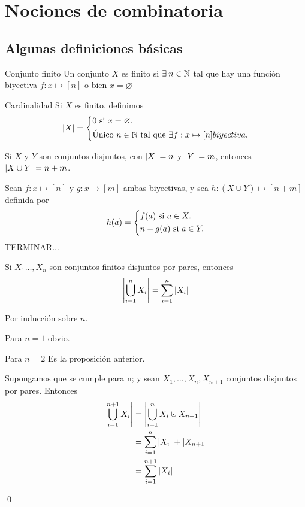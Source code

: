 \section{Nociones de combinatoria}
	\subsection{Algunas definiciones básicas}
		\begin{definition}{Conjunto finito}
			Un conjunto $X$ es finito si $\exists\:n\in\mathbb{N}$ tal que hay una función biyectiva $f:x\mapsto[n]$ o bien $x=\varnothing$ 
		\end{definition}
		\begin{definition}{Cardinalidad}
			Si $X$ es finito. definimos
			\[
				\abs{X}=
				\begin{dcases}
					0\text{ si }x=\varnothing.\\
					\text{Único $n\in\mathbb{N}$ tal que $\exists f:x\mapsto[n]$} biyectiva.
				\end{dcases}
			\]
		\end{definition}
		\begin{theorem}{}
			Si $X$ y $Y$ son conjuntos disjuntos, con $\abs{X}=n$ y $\abs{Y}=m$, entonces $\abs{X\cup Y}=n+m$.
		\end{theorem}
		\begin{demostration}{}
			Sean $f:x\mapsto[n]$ y $g:x\mapsto[m]$ ambas biyectivas, y sea $h:(X\cup Y)\mapsto[n+m]$ definida por
			\[
			h(a)=
			\begin{dcases}
				f(a)\text{ si }a\in X.\\
				n+g(a)\text{ si }a\in Y.
			\end{dcases}
			\]
			TERMINAR...
		\end{demostration}
		\begin{corollary}{}
			Si $X_1\dotso,X_n$ son conjuntos finitos disjuntos por pares, entonces
			$$\abs{\bigcup_{i=1}^{n}{X_i}}=\sum_{i=1}^{n}{\abs{X_i}}$$
		\end{corollary}
		\begin{demostration}{}
			Por inducción sobre $n$.
			
			Para $n=1$ obvio.
	
			Para $n=2$ Es la proposición anterior.
			
			Supongamos que se cumple para n; y sean $X_1,\dotso,X_n,X_{n+1}$ conjuntos disjuntos por pares. Entonces
			\begin{align*}
				\abs{\bigcup_{i=1}^{n+1}{X_i}}&=\abs{\bigcup_{i=1}^{n}{X_i}\cupdot X_{n+1}}\\
				&=\sum_{i=1}^{n}{\abs{X_i}}+\abs{X_{n+1}}\\
				&=\sum_{i=1}^{n+1}{\abs{X_i}}
			\end{align*}
			\begin{flushright}
				\qed
			\end{flushright}
		\end{demostration}
